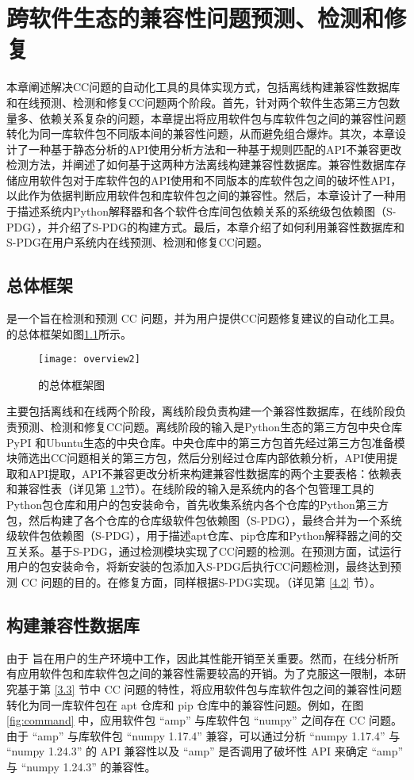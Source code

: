 \chapter{跨软件生态的兼容性问题预测、检测和修复}
本章阐述解决CC问题的自动化工具\tool{}的具体实现方式，包括离线构建兼容性数据库和在线预测、检测和修复CC问题两个阶段。首先，针对两个软件生态第三方包数量多、依赖关系复杂的问题，本章提出将应用软件包与库软件包之间的兼容性问题转化为同一库软件包不同版本间的兼容性问题，从而避免组合爆炸。其次，本章设计了一种基于静态分析的API使用分析方法和一种基于规则匹配的API不兼容更改检测方法，并阐述了如何基于这两种方法离线构建兼容性数据库。兼容性数据库存储应用软件包对于库软件包的API使用和不同版本的库软件包之间的破坏性API，\tool{}以此作为依据判断应用软件包和库软件包之间的兼容性。然后，本章设计了一种用于描述系统内Python解释器和各个软件仓库间包依赖关系的系统级包依赖图（S-PDG），并介绍了S-PDG的构建方式。最后，本章介绍了\tool{}如何利用兼容性数据库和S-PDG在用户系统内在线预测、检测和修复CC问题。

\section{总体框架}
\tool{}是一个旨在检测和预测 CC 问题，并为用户提供CC问题修复建议的自动化工具。\tool{}的总体框架如图\ref{fig:overview}所示。
\begin{figure}[htbp] %
	\centering
	\texttt{[image: overview2]}
	\caption{\tool{}的总体框架图}
	\label{fig:overview}
\end{figure}
\tool{}主要包括离线和在线两个阶段，离线阶段负责构建一个兼容性数据库，在线阶段负责预测、检测和修复CC问题。离线阶段的输入是Python生态的第三方包中央仓库PyPI 和Ubuntu生态的中央仓库。中央仓库中的第三方包首先经过第三方包准备模块筛选出CC问题相关的第三方包，然后分别经过仓库内部依赖分析，API使用提取和API提取，API不兼容更改分析来构建兼容性数据库的两个主要表格：依赖表和兼容性表（详见第 \ref{4.1}节）。在线阶段的输入是系统内的各个包管理工具的Python包仓库和用户的包安装命令，\tool{}首先收集系统内各个仓库的Python第三方包，然后构建了各个仓库的仓库级软件包依赖图（S-PDG），最终合并为一个系统级软件包依赖图（S-PDG），用于描述apt仓库、pip仓库和Python解释器之间的交互关系。基于S-PDG，\tool{}通过检测模块实现了CC问题的检测。在预测方面，\tool{}试运行用户的包安装命令，将新安装的包添加入S-PDG后执行CC问题检测，最终达到预测 CC 问题的目的。在修复方面，\tool{}同样根据S-PDG实现。（详见第 \ref{4.2} 节）。

\section{构建兼容性数据库}\label{4.1}
由于 \tool{} 旨在用户的生产环境中工作，因此其性能开销至关重要。然而，在线分析所有应用软件包和库软件包之间的兼容性需要较高的开销。为了克服这一限制，本研究基于第 \ref{3.3} 节中 CC 问题的特性，将应用软件包与库软件包之间的兼容性问题转化为同一库软件包在 apt 仓库和 pip 仓库中的兼容性问题。例如，在图 \ref{fig:command} 中，应用软件包 “amp” 与库软件包 “numpy” 之间存在 CC 问题。由于 “amp” 与库软件包 “numpy 1.17.4” 兼容，\tool{}可以通过分析 “numpy 1.17.4” 与 “numpy 1.24.3” 的 API 兼容性以及 “amp” 是否调用了破坏性 API 来确定 “amp” 与 “numpy 1.24.3” 的兼容性。


